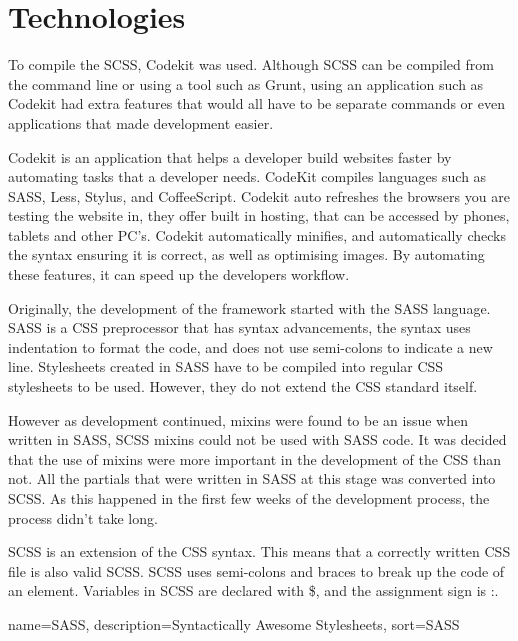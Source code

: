 \newpage
\section*{Technologies}

To compile the \gls{SCSS}, Codekit \citep{CODEKIT17} was used. Although \gls{SCSS} can be compiled from the command line or using a tool such as Grunt, using an application such as Codekit had extra features that would all have to be separate commands or even applications that made development easier. 

Codekit is an application that helps a developer build websites faster by automating tasks that a developer needs. CodeKit compiles languages such as SASS, Less, Stylus, and CoffeeScript. Codekit auto refreshes the browsers you are testing the website in, they offer built in hosting, that can be accessed by phones, tablets and other PC's. Codekit automatically minifies, and automatically checks the syntax ensuring it is correct, as well as optimising images. By automating these features, it can speed up the developers workflow. 

Originally, the development of the framework started with the \gls{SASS} language. \gls{SASS} is a \gls{CSS} preprocessor that has syntax advancements, the syntax uses indentation to format the code, and does not use semi-colons to indicate a new line. Stylesheets created in \gls{SASS} have to be compiled into regular \gls{CSS} stylesheets to be used. However, they do not extend the \gls{CSS} standard itself. 

However as development continued, mixins were found to be an issue when written in \gls{SASS}, \gls{SCSS} mixins could not be used with \gls{SASS} code. It was decided that the use of mixins were more important in the development of the \gls{CSS} than not. All the partials that were written in \gls{SASS} at this stage was converted into \gls{SCSS}. As this happened in the first few weeks of the development process, the process didn't take long. 

\gls{SCSS} is an extension of the \gls{CSS} syntax. This means that a correctly written \gls{CSS} file is also valid \gls{SCSS}. \gls{SCSS} uses semi-colons and braces to break up the code of an element. Variables in \gls{SCSS} are declared with \$, and the assignment sign is :. 

%
{
  name={SASS},
  description={Syntactically Awesome Stylesheets},
  sort=SASS
}
%

